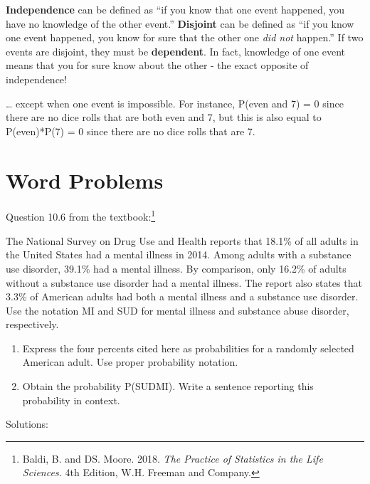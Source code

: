 \documentclass[
  letterpaper,
  DIV=11,
  numbers=noendperiod]{scrreprt}
\providecommand{\tightlist}{%
  \setlength{\itemsep}{0pt}\setlength{\parskip}{0pt}}\usepackage{longtable,booktabs,array}
\begin{document}
\textbf{Independence} can be defined as ``if you know that one event
happened, you have no knowledge of the other event.'' \textbf{Disjoint}
can be defined as ``if you know one event happened, you know for sure
that the other one \emph{did not} happen.'' If two events are disjoint,
they must be \textbf{dependent}. In fact, knowledge of one event means
that you for sure know about the other - the exact opposite of
independence!

\ldots{} except when one event is impossible. For instance, P(even and
7) = 0 since there are no dice rolls that are both even and 7, but this
is also equal to P(even)*P(7) = 0 since there are no dice rolls that are
7.

\hypertarget{word-problems}{%
\chapter{Word Problems}\label{word-problems}}

Question 10.6 from the textbook:\footnote{Baldi, B. and DS. Moore. 2018.
  \emph{The Practice of Statistics in the Life Sciences.} 4th Edition,
  W.H. Freeman and Company.}

The National Survey on Drug Use and Health reports that 18.1\% of all
adults in the United States had a mental illness in 2014. Among adults
with a substance use disorder, 39.1\% had a mental illness. By
comparison, only 16.2\% of adults without a substance use disorder had a
mental illness. The report also states that 3.3\% of American adults had
both a mental illness and a substance use disorder. Use the notation MI
and SUD for mental illness and substance abuse disorder, respectively.

\begin{enumerate}
\def\labelenumi{\alph{enumi}.}
\tightlist
\item
  Express the four percents cited here as probabilities for a randomly
  selected American adult. Use proper probability notation.
\item
  Obtain the probability P(SUD\textbar MI). Write a sentence reporting
  this probability in context.
\end{enumerate}

Solutions:
\end{document}
